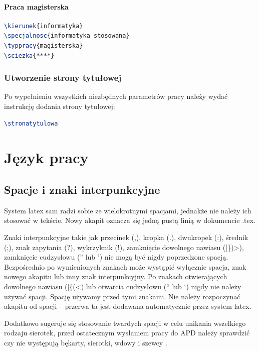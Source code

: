 \documentclass{wfiisul}
\begin{document}
\subsubsection{Praca magisterska}
\begin{lstlisting}[language=TeX, basicstyle=\ttfamily]
\kierunek{informatyka}
\specjalnosc{informatyka stosowana}
\typpracy{magisterska}
\sciezka{****}
\end{lstlisting}

\subsection{Utworzenie strony tytułowej}

Po wypełnieniu wszystkich niezbędnych parametrów pracy należy wydać instrukcję  dodania strony tytułowej:

\begin{lstlisting}[language=TeX, basicstyle=\ttfamily, inputencoding=utf8, extendedchars=false]
\stronatytulowa
\end{lstlisting}


\chapter{Język pracy}

\section{Spacje i znaki interpunkcyjne}
System latex sam radzi sobie ze wielokrotnymi spacjami, jednakże nie należy ich stosować w tekście. Nowy akapit oznacza się jedną pustą linią w dokumencie .tex. 

Znaki interpunkcyjne takie jak przecinek (,), kropka (.), dwukropek (:), średnik (;), znak zapytania (?), wykrzyknik (!), zamknięcie dowolnego nawiasu (]\})>), zamknięcie cudzysłowu ('' lub ') nie mogą być nigdy poprzedzone spacją. Bezpośrednio po wymienionych znakach może wystąpić wyłącznie spacja, znak nowego akapitu lub inny znak interpunkcyjny. Po znakach otwierających dowolnego nawiasu ([\{(<) lub otwarcia cudzysłowu (`` lub `) nigdy nie należy używać spacji. Spację używamy przed tymi znakami. Nie należy rozpoczynać akapitu od spacji – przerwa ta jest dodawana  automatycznie przez system latex.

Dodatkowo sugeruje się stosowanie twardych spacji w celu unikania wszelkiego rodzaju sierotek, przed ostatecznym wysłaniem pracy do APD należy sprawdzić czy nie występują  bękarty, sierotki, wdowy i szewcy \cite{Bekart}.
\end{document}
